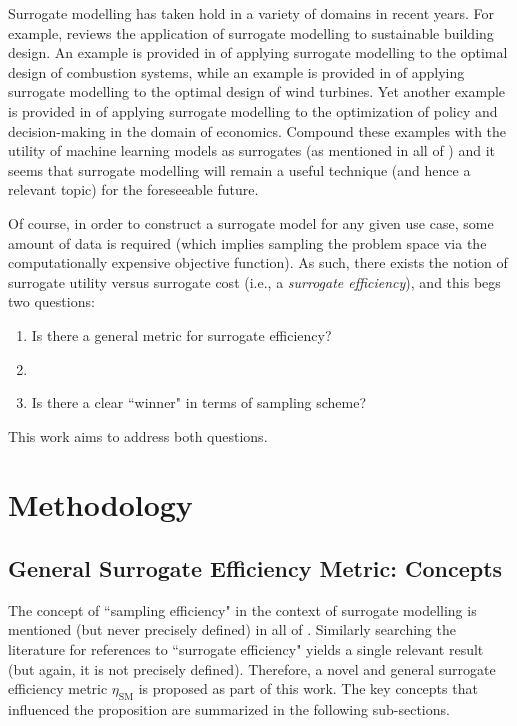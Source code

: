 \documentclass[conference]{IEEEtran}
\begin{document}
	Surrogate modelling has taken hold in a variety of domains in recent years. For example, \cite{Westermann_2019} reviews the application of surrogate modelling to sustainable building design. An example is provided in \cite{Liu_2023} of applying surrogate modelling to the optimal design of combustion systems, while an example is provided in \cite{Haghi_2022} of applying surrogate modelling to the optimal design of wind turbines. Yet another example is provided in \cite{vanderHoog_2018} of applying surrogate modelling to the optimization of policy and decision-making in the domain of economics. Compound these examples with the utility of machine learning models as surrogates (as mentioned in all of \cite{Westermann_2019, Liu_2023, vanderHoog_2018}) and it seems that surrogate modelling will remain a useful technique (and hence a relevant topic) for the foreseeable future.
	
	Of course, in order to construct a surrogate model for any given use case, some amount of data is required (which implies sampling the problem space via the computationally expensive objective function). As such, there exists the notion of surrogate utility versus surrogate cost (i.e., a \textit{surrogate efficiency}), and this begs two questions:
	
\begin{enumerate}
	\item Is there a general metric for surrogate efficiency?
	\item []
	\item Is there a clear ``winner" in terms of sampling scheme?
\end{enumerate}

\noindent This work aims to address both questions.

\section{Methodology}

\subsection{General Surrogate Efficiency Metric: Concepts}

The concept of ``sampling efficiency" in the context of surrogate modelling is mentioned (but never precisely defined) in all of \cite{Gong_2017, Westermann_2019_2, Yin_2011}. Similarly searching the literature for references to ``surrogate efficiency" yields a single relevant result \cite{Casper_2016} (but again, it is not precisely defined). Therefore, a novel and general surrogate efficiency metric $\eta_\textrm{SM}$ is proposed as part of this work. The key concepts that influenced the proposition are summarized in the following sub-sections.
\end{document}
